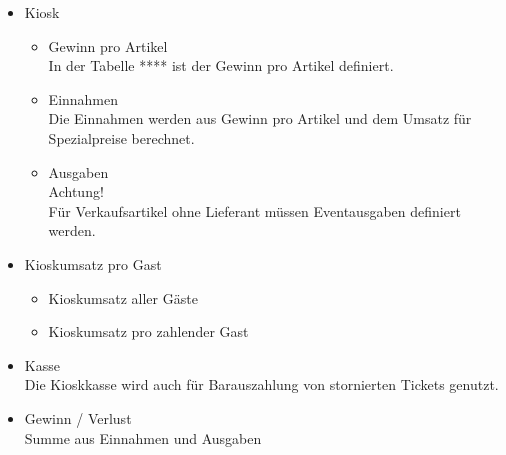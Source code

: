 \documentclass[
]{article}
\providecommand{\tightlist}{%
  \setlength{\itemsep}{0pt}\setlength{\parskip}{0pt}}
\begin{document}
\begin{itemize}
  \begin{itemize}
  \tightlist
  \item
    Einnahmen

    \begin{itemize}
    \tightlist
    \item
      In der Tabelle Inputdaten \textbf{Einnahmen} Kategorie
      \textbf{Event} werden alle Einnahmen für einen Spezifischen Event
      erfasst. Bitte Event ID korrekt auswählen.
    \end{itemize}
  \item
    Ausgaben

    \begin{itemize}
    \tightlist
    \item
      In der Tabelle \textbf{Ausgaben}\\
      wird die \textbf{Eventausgaben} wird pro Filmabrechnung
      (Spieldatum) berücksichtigt.
    \end{itemize}
  \end{itemize}
\item
  Kiosk

  \begin{itemize}
  \tightlist
  \item
    Gewinn pro Artikel\\
    In der Tabelle **** ist der Gewinn pro Artikel definiert.
  \item
    Einnahmen\\
    Die Einnahmen werden aus Gewinn pro Artikel und dem Umsatz für
    Spezialpreise berechnet.
  \item
    Ausgaben\\
    Achtung!\\
    Für Verkaufsartikel ohne Lieferant müssen Eventausgaben definiert
    werden.
  \end{itemize}
\item
  Kioskumsatz pro Gast

  \begin{itemize}
  \tightlist
  \item
    Kioskumsatz aller Gäste
  \item
    Kioskumsatz pro zahlender Gast
  \end{itemize}
\item
  Kasse\\
  Die Kioskkasse wird auch für Barauszahlung von stornierten Tickets
  genutzt.
\item
  Gewinn / Verlust\\
  Summe aus Einnahmen und Ausgaben
\end{itemize}
\end{document}
